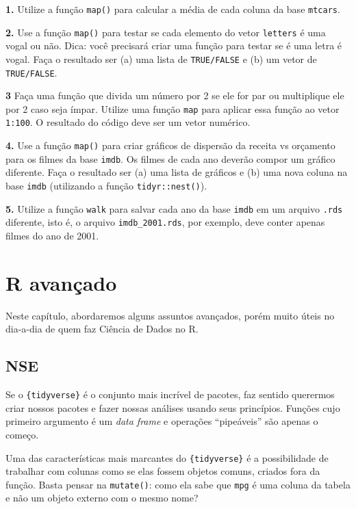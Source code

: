 \documentclass[
]{book}
\begin{document}
\textbf{1.} Utilize a função \texttt{map()} para calcular a média de cada coluna da base \texttt{mtcars}.

\textbf{2.} Use a função \texttt{map()} para testar se cada elemento do vetor \texttt{letters} é uma vogal ou não. Dica: você precisará criar uma função para testar se é uma letra é vogal. Faça o resultado ser (a) uma lista de \texttt{TRUE/FALSE} e (b) um vetor de \texttt{TRUE/FALSE}.

\textbf{3} Faça uma função que divida um número por 2 se ele for par ou multiplique ele por 2 caso seja ímpar. Utilize uma função \texttt{map} para aplicar essa função ao vetor \texttt{1:100}. O resultado do código deve ser um vetor numérico.

\textbf{4.} Use a função \texttt{map()} para criar gráficos de dispersão da receita vs orçamento para os filmes da base \texttt{imdb}. Os filmes de cada ano deverão compor um gráfico diferente. Faça o resultado ser (a) uma lista de gráficos e (b) uma nova coluna na base \texttt{imdb} (utilizando a função \texttt{tidyr::nest()}).

\textbf{5.} Utilize a função \texttt{walk} para salvar cada ano da base \texttt{imdb} em um arquivo \texttt{.rds} diferente, isto é, o arquivo \texttt{imdb\_2001.rds}, por exemplo, deve conter apenas filmes do ano de 2001.

\hypertarget{ravancado}{%
\chapter{R avançado}\label{ravancado}}

Neste capítulo, abordaremos alguns assuntos avançados, porém muito úteis no dia-a-dia de quem faz Ciência de Dados no R.

\hypertarget{nse}{%
\section{NSE}\label{nse}}

Se o \texttt{\{tidyverse\}} é o conjunto mais incrível de pacotes, faz sentido querermos criar nossos pacotes e fazer nossas análises usando seus princípios. Funções cujo primeiro argumento é um \emph{data frame} e operações ``pipeáveis'' são apenas o começo.

Uma das características mais marcantes do \texttt{\{tidyverse\}} é a possibilidade de trabalhar com colunas como se elas fossem objetos comuns, criados fora da função. Basta pensar na \texttt{mutate()}: como ela sabe que \texttt{mpg} é uma coluna da tabela e não um objeto externo com o mesmo nome?
\end{document}
